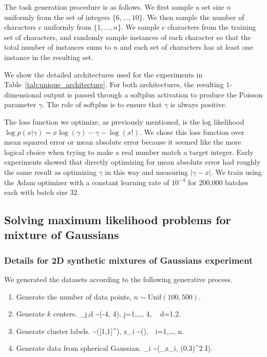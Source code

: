 \documentclass{article}
\def\gN{{\mathcal{N}}}
\def\[#1\]{\begin{align}#1\end{align}}
\begin{document}
The task generation procedure is as follows.
We first sample a set size $n$ uniformly from the set of integers $\{ 6, \ldots, 10\}$.
We then sample the number of characters $c$ uniformly from $ \{ 1, \ldots, n \}$.
We sample $c$ characters from the training set of characters, and randomly sample instances of each character so that the total number of instances sums to $n$ and each set of characters has at least one instance in the resulting set.

We show the detailed architectures used for the experiments in Table~\ref{tab:unique_architecture}.
For both architectures, the resulting $1$-dimensional output is passed through a $\mathrm{softplus}$ activation to produce the Poisson parameter $\gamma$.
The role of $\mathrm{softplus}$ is to ensure that $\gamma$ is always positive.

The loss function we optimize, as previously mentioned, is the log likelihood $\log p(x | \gamma) = x \log(\gamma) - \gamma - \log(x!)$.
We chose this loss function over mean squared error or mean absolute error because it seemed like the more logical choice when trying to make a real number match a target integer.
Early experiments showed that directly optimizing for mean absolute error had roughly the same result as optimizing $\gamma$ in this way and measuring $|\gamma - x|$.
We train using the Adam optimizer with a constant learning rate of $10^{-4}$ for 200,000 batches each with batch size 32.



\subsection{Solving maximum likelihood problems for mixture of Gaussians}
\label{subsec:clustering}
\subsubsection{Details for 2D synthetic mixtures of Gaussians experiment}
We generated the datasets according to the following generative process.
\begin{enumerate}
\item Generate the number of data points, $n \sim \mathrm{Unif}(100, 500)$.
\item Generate $k$ centers.
\[
\mu_{j,d} \sim {}(-4, 4), \quad j=1,\dots, 4, \,\,\, d=1,2.
 \]
\item Generate cluster labels.
\[
\pi \sim {}([1,1]^\top), \quad z_i \sim {}(\pi), \,\,  i=1,\dots, n.
\]
\item Generate data from spherical Gaussian.
\[
x_i \sim \gN(\mu_{z_i}, (0.3)^2 I).
\]
\end{enumerate}
\end{document}
